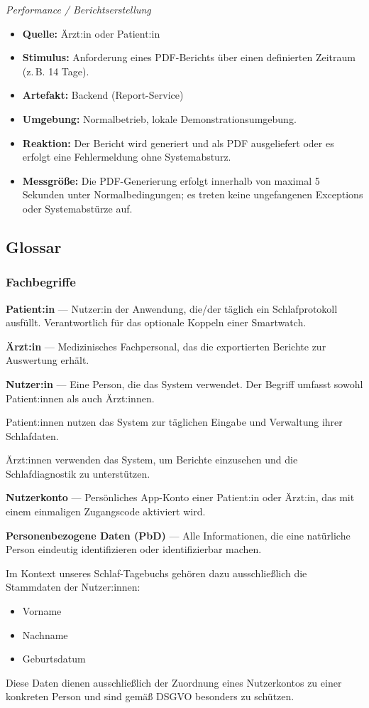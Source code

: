 \textit{Performance / Berichtserstellung}
\begin{itemize}
  \item[] \textbf{Quelle:} Ärzt:in oder Patient:in
  \item[] \textbf{Stimulus:} Anforderung eines PDF-Berichts über einen definierten Zeitraum (z.\,B. 14 Tage).
  \item[] \textbf{Artefakt:} Backend (Report-Service)
  \item[] \textbf{Umgebung:} Normalbetrieb, lokale Demonstrationsumgebung.
  \item[] \textbf{Reaktion:} Der Bericht wird generiert und als PDF ausgeliefert oder es erfolgt eine Fehlermeldung ohne Systemabsturz.
  \item[] \textbf{Messgröße:} Die PDF-Generierung erfolgt innerhalb von maximal 5 Sekunden unter Normalbedingungen; es treten keine ungefangenen Exceptions oder Systemabstürze auf.
\end{itemize}

\subsection{Glossar}

\subsubsection{Fachbegriffe}
\textbf{Patient:in} — Nutzer:in der Anwendung, die/der täglich ein Schlafprotokoll ausfüllt. Verantwortlich für das optionale Koppeln einer Smartwatch.

\textbf{Ärzt:in} — Medizinisches Fachpersonal, das die exportierten Berichte zur Auswertung erhält.

\textbf{Nutzer:in} — Eine Person, die das System verwendet. Der Begriff umfasst sowohl Patient:innen als auch Ärzt:innen.

Patient:innen nutzen das System zur täglichen Eingabe und Verwaltung ihrer Schlafdaten. 

Ärzt:innen verwenden das System, um Berichte einzusehen und die Schlafdiagnostik zu unterstützen. 

\textbf{Nutzerkonto} — Persönliches App-Konto einer Patient:in oder Ärzt:in, das mit einem einmaligen Zugangscode aktiviert wird. 

\textbf{Personenbezogene Daten (PbD)} — Alle Informationen, die eine natürliche Person eindeutig identifizieren oder identifizierbar machen. 

Im Kontext unseres Schlaf-Tagebuchs gehören dazu ausschließlich die Stammdaten der Nutzer:innen:
\begin{itemize}
    \item Vorname
    \item Nachname
    \item Geburtsdatum
\end{itemize}
Diese Daten dienen ausschließlich der Zuordnung eines Nutzerkontos zu einer konkreten Person und sind gemäß DSGVO besonders zu schützen. 


